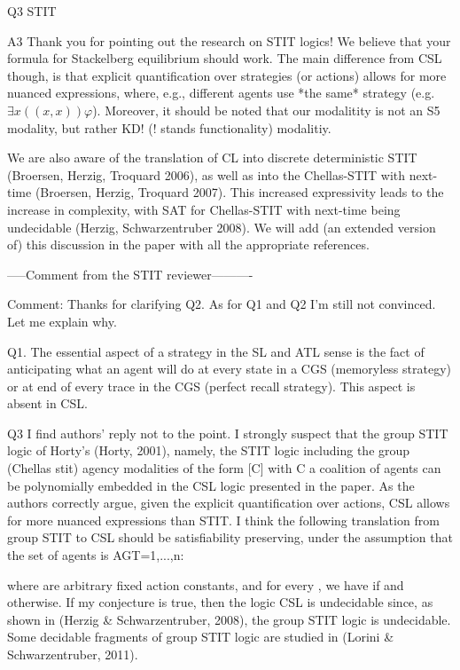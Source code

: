 Q3 STIT

A3 Thank you for pointing out the research on STIT logics! We believe that your formula for Stackelberg equilibrium should work. The main difference from CSL though, is that explicit quantification over strategies (or actions) allows for more nuanced expressions, where, e.g., different agents use *the same* strategy (e.g. $\exists x ((x,x))\varphi$). Moreover, it should be noted that our modalitity is not an S5 modality, but rather KD! (! stands functionality) modalitiy.

We are also aware of the translation of CL into discrete deterministic STIT (Broersen, Herzig, Troquard 2006), as well as into the Chellas-STIT with next-time (Broersen, Herzig, Troquard 2007). This increased expressivity leads to the increase in complexity, with SAT for Chellas-STIT with next-time being undecidable (Herzig, Schwarzentruber 2008). We will add (an extended version of) this discussion in the paper with all the appropriate references. 


-----Comment from the STIT reviewer----------

Comment:
Thanks for clarifying Q2. As for Q1 and Q2 I'm still not convinced. Let me explain why.

Q1. The essential aspect of a strategy in the SL and ATL sense is the fact of anticipating what an agent will do at every state in a CGS (memoryless strategy) or at end of every trace in the CGS (perfect recall strategy). This aspect is absent in CSL.

Q3 I find authors' reply not to the point. I strongly suspect that the group STIT logic of Horty's (Horty, 2001), namely, the STIT logic including the group (Chellas stit) agency modalities of the form [C] with C a coalition of agents can be polynomially embedded in the CSL logic presented in the paper. As the authors correctly argue, given the explicit quantification over actions, CSL allows for more nuanced expressions than STIT. I think the following translation from group STIT to CSL should be satisfiability preserving, under the assumption that the set of agents is AGT={1,...,n}:





where  are arbitrary fixed action constants,  and for every , we have  if  and  otherwise. If my conjecture is true, then the logic CSL is undecidable since, as shown in (Herzig & Schwarzentruber, 2008), the group STIT logic is undecidable. Some decidable fragments of group STIT logic are studied in (Lorini & Schwarzentruber, 2011).

